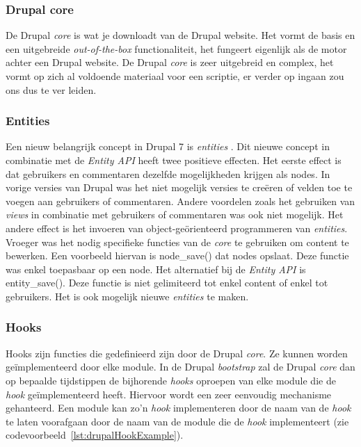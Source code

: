 \subsubsection{Drupal core}
De Drupal \textit{core} is wat je downloadt van de Drupal website. Het vormt de basis en een uitgebreide \textit{out-of-the-box} functionaliteit, het fungeert eigenlijk als de motor achter een Drupal website. De Drupal \textit{core} is zeer uitgebreid en complex, het vormt op zich al voldoende materiaal voor een scriptie, er verder op ingaan zou ons dus te ver leiden.

\subsubsection{Entities}
Een nieuw belangrijk concept in Drupal 7 is \textit{entities} \cite{entities}. Dit nieuwe concept in combinatie met de \textit{Entity API} heeft twee positieve effecten. Het eerste effect is dat gebruikers en commentaren dezelfde mogelijkheden krijgen als nodes. In vorige versies van Drupal was het niet mogelijk versies te cre\"{e}ren of velden toe te voegen aan gebruikers of commentaren. Andere voordelen zoals het gebruiken van \textit{views} in combinatie met gebruikers of commentaren was ook niet mogelijk. Het andere effect is het invoeren van object-ge\"{o}rienteerd programmeren van \textit{entities}. Vroeger was het nodig specifieke functies van de \textit{core} te gebruiken om content te bewerken. Een voorbeeld hiervan is node\_save() dat nodes opslaat. Deze functie was enkel toepasbaar op een node. Het alternatief bij de \textit{Entity API} is entity\_save(). Deze functie is niet gelimiteerd tot enkel content of enkel tot gebruikers.
Het is ook mogelijk nieuwe \textit{entities} te maken. %

\subsubsection{Hooks}
Hooks zijn functies die gedefinieerd zijn door de Drupal \textit{core}. Ze kunnen worden ge\"{i}mplementeerd door elke module. In de Drupal \textit{bootstrap} zal de Drupal \textit{core} dan op bepaalde tijdstippen de bijhorende \textit{hooks} oproepen van elke module die de \textit{hook} ge\"{i}mplementeerd heeft. Hiervoor wordt een zeer eenvoudig mechanisme gehanteerd. Een module kan zo'n \textit{hook} implementeren door de naam van de \textit{hook} te laten voorafgaan door de naam van de module die de \textit{hook} implementeert (zie codevoorbeeld~\ref{lst:drupalHookExample}).\\

